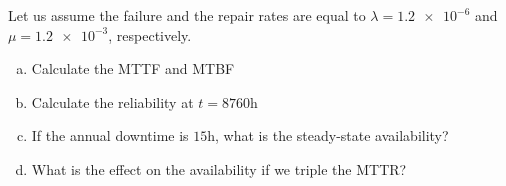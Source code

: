 \documentclass{article}
\begin{document}
\pagebreak

\begin{question}
    Let us assume the failure and the repair rates are equal to $\lambda = \num{1.2e-6}$ and $\mu = \num{1.2e-3}$, respectively.
	\begin{enumerate}[(a)]
		\item Calculate the MTTF and MTBF
		\item Calculate the reliability at $t = 8760 \unit{\hour}$
		\item If the annual downtime is $15\unit{\hour}$, what is the steady-state availability?
		\item What is the effect on the availability if we triple the MTTR?
	\end{enumerate}

\end{question}
\end{document}
